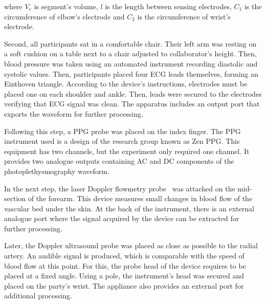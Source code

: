 where $V_e$ is segment's volume, $l$ is the length between sensing electrodes, $C_1$ is the circumference of elbow's electrode and $C_2$ is the circumference of wrist's electrode.

Second, all participants sat in a comfortable chair. Their left arm was resting on a soft cushion on a table next to a chair adjusted to collaborator's height. Then, blood pressure was taken using an automated instrument recording diastolic and systolic values. Then, participants placed four ECG leads themselves, forming an Einthoven triangle. According to the device's instructions, electrodes must be placed one on each shoulder and ankle. Then, leads were secured to the electrodes verifying that ECG signal was clean. The apparatus includes an output port that exports the waveform for further processing.



Following this step, a PPG probe was placed on the index finger. The PPG instrument used is a design of the research group known as Zen PPG. This equipment has two channels, but the experiment only required one channel. It provides two analogue outputs containing AC and DC components of the photoplethysmography waveform. 


In the next step, the laser Doppler flowmetry probe~\cite{moor:LDF2} was attached on the mid-section of the forearm. This device measures small changes in blood flow of the vascular bed under the skin. At the back of the instrument, there is an external analogue port where the signal acquired by the device can be extracted for further processing.  


Later, the Doppler ultrasound probe was placed as close as possible to the radial artery. An audible signal is produced, which is comparable with the speed of blood flow at this point. For this, the probe head of the device requires to be placed at a fixed angle. Using a pole, the instrument's head was secured and placed on the party's wrist. The appliance also provides an external port for additional processing.  


